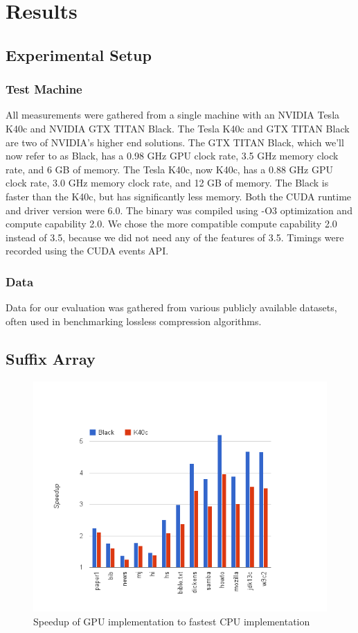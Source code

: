 \chapter{Results}
\label{chap:results}

\section{Experimental Setup}
\subsection{Test Machine}
All measurements were gathered from a single machine with an NVIDIA Tesla K40c and NVIDIA GTX TITAN Black.
The Tesla K40c and GTX TITAN Black are two of NVIDIA's higher end solutions.
The GTX TITAN Black, which we'll now refer to as Black, has a 0.98 GHz GPU clock rate, 3.5 GHz memory clock rate, and 6 GB of memory.
The Tesla K40c, now K40c, has a 0.88 GHz GPU clock rate, 3.0 GHz memory clock rate, and 12 GB of memory.
The Black is faster than the K40c, but has significantly less memory.
Both the CUDA runtime and driver version were 6.0.
The binary was compiled using -O3 optimization and compute capability 2.0.
We chose the more compatible compute capability 2.0 instead of 3.5, because we did not need any of the features of 3.5.
Timings were recorded using the CUDA events API.

\subsection{Data}

Data for our evaluation was gathered from various publicly available datasets, often used in benchmarking lossless compression algorithms.

\section{Suffix Array}

\begin{figure}[ht!]
\centering
\includegraphics[width=1.0\textwidth]{images/saresult.png}
\caption{Speedup of GPU implementation to fastest CPU implementation}
\label{fig:saresult}
\end{figure}

